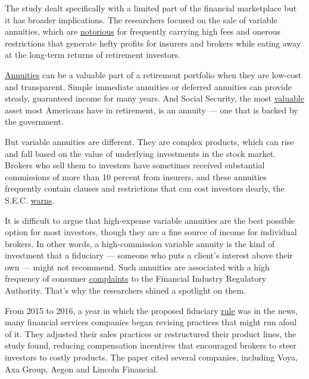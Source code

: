 The study dealt specifically with a limited part of the financial
marketplace but it has broader implications. The researchers focused on
the sale of variable annuities, which are
\href{https://www.nytimes3xbfgragh.onion/2015/06/20/your-money/variable-annuities-with-guaranteed-income-riders-require-careful-scrutiny.html}{notorious}
for frequently carrying high fees and onerous restrictions that generate
hefty profits for insurers and brokers while eating away at the
long-term returns of retirement investors.

\href{https://www.nytimes3xbfgragh.onion/2019/07/01/business/rolling-stones-social-security-retirement.html}{Annuities}
can be a valuable part of a retirement portfolio when they are low-cost
and transparent. Simple immediate annuities or deferred annuities can
provide steady, guaranteed income for many years. And Social Security,
the most
\href{https://www.nytimes3xbfgragh.onion/2020/05/29/business/Social-Security-benefits-shortfall-coronavirus.html}{valuable}
asset most Americans have in retirement, is an annuity --- one that is
backed by the government.

But variable annuities are different. They are complex products, which
can rise and fall based on the value of underlying investments in the
stock market. Brokers who sell them to investors have sometimes received
substantial commissions of more than 10 percent from insurers, and these
annuities frequently contain clauses and restrictions that can cost
investors dearly, the S.E.C.
\href{https://www.sec.gov/investor/pubs/sec-guide-to-variable-annuities.pdf}{warns}.

It is difficult to argue that high-expense variable annuities are the
best possible option for most investors, though they are a fine source
of income for individual brokers. In other words, a high-commission
variable annuity is the kind of investment that a fiduciary --- someone
who puts a client's interest above their own --- might not recommend.
Such annuities are associated with a high frequency of consumer
\href{https://brokercheck.finra.org/}{complaints} to the Financial
Industry Regulatory Authority. That's why the researchers shined a
spotlight on them.

From 2015 to 2016, a year in which the proposed fiduciary
\href{https://www.nytimes3xbfgragh.onion/2015/04/08/opinion/successful-investing-for-the-long-haul.html}{rule}
was in the news, many financial services companies began revising
practices that might run afoul of it. They adjusted their sales
practices or restructured their product lines, the study found, reducing
compensation incentives that encouraged brokers to steer investors to
costly products. The paper cited several companies, including Voya, Axa
Group, Aegon and Lincoln Financial.

